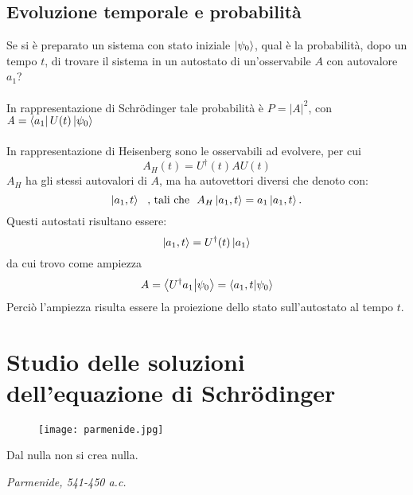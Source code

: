 \documentclass[twoside]{article}
\begin{document}
\vspace{0.5cm}

\subsection{Evoluzione temporale e probabilità}
Se si è preparato un sistema con stato iniziale $\ket{\psi_0}$, qual è la probabilità, dopo un tempo $t$, di trovare il sistema in un autostato di un'osservabile $A$ con autovalore $a_1$?
\\
\\
In rappresentazione di Schr\"odinger tale probabilità è $\textit{P}=|\textit{A}|^2$, con $\textit{A}=\bra{a_1}U(t)\ket{\psi_0}$
\\
\\
In rappresentazione di Heisenberg sono le osservabili ad evolvere, per cui 
\begin{equation}
A_H(t)=U^{\dagger}(t)AU(t)
\end{equation}
 $A_H$ ha gli stessi autovalori di $A$, ma ha autovettori diversi che denoto con:
 \begin{equation}
 \ket{a_1, t} \ \ \text{, tali che} \ \ A_H \ket{a_1,t}=a_1 \ket{a_1,t}.
\end{equation}
Questi autostati risultano essere: 
\begin{equation}
\ket{a_1,t}=U^{\dagger}(t)\ket{a_1}
\end{equation}
da cui trovo come ampiezza 
\begin{equation}
A=\bra{U^{\dagger}a_1}\ket{\psi_0}=\bra{a_1,t}\ket{\psi_0}
\end{equation}
Perciò l'ampiezza risulta essere la proiezione dello stato sull'autostato al tempo $t$.


\newpage

\section{Studio delle soluzioni dell'equazione di Schr\"odinger}

\begin{wrapfigure}[4]{L}{0.2\textwidth}
  \begin{center}
    \texttt{[image: parmenide.jpg]}
  \end{center}
\end{wrapfigure}\leavevmode

\vspace{12mm}
\epigraph{Dal nulla non si crea nulla.}{\textit{Parmenide, 541-450 a.c.}}
\vspace{12mm}
\end{document}
